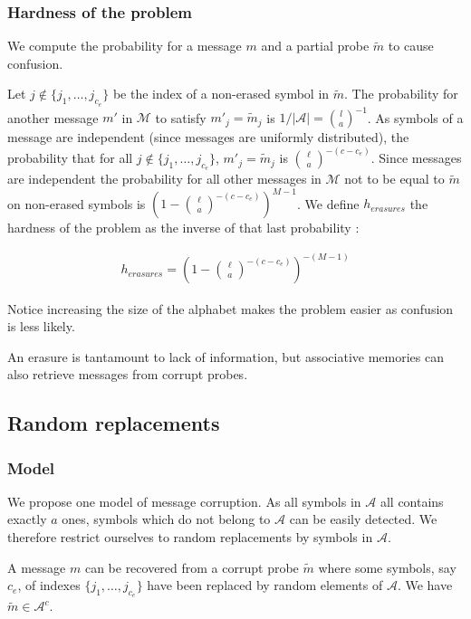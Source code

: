 \documentclass[english,10pt,twocolumn]{IEEEtran}
\theoremstyle{definition}
\begin{document}
	
	

	\subsubsection{Hardness of the problem}
	
	We compute the probability for a message $m$ and a partial probe $\tilde{m}$ to cause confusion.
	
	Let $j\not\in \{j_1, \dots , j_{c_e} \}$ be the index of a non-erased symbol in $\tilde{m}$. The probability for another message $m'$ in $\mathcal{M}$ to satisfy $m'_j = \tilde{m}_j$ is $1/|\mathcal{A}| = \binom{l}{a}^{-1}$. As symbols of a message are independent (since messages are uniformly distributed), the probability that for all $j\not\in \{j_1, \dots , j_{c_e} \}$, $m'_{j} = \tilde{m}_j$ is ${\ell \choose a}^{-(c - c_e)}$. Since messages are independent the probability for all other messages in $\mathcal{M}$ not to be equal to $\tilde{m}$ on non-erased symbols is $\left(1-{\ell \choose a}^{-(c - c_e)}\right)^{M-1}$. We define $h_{erasures}$ the hardness of the problem as the inverse of that last probability : 
	
	\begin{align}
		h_{erasures} = \left(1-{\ell \choose a}^{-(c - c_e)}\right)^{-(M-1)}
		\label{herrth}
	\end{align}
	
	Notice increasing the size of the alphabet makes the problem easier as confusion is less likely.

	An erasure is tantamount to lack of information, but associative memories can also retrieve messages from corrupt probes.
	
	\subsection{Random replacements}
	
	\subsubsection{Model}	
	We propose one model of message corruption. As all symbols in $\mathcal{A}$ all contains exactly $a$ ones, symbols which do not belong to $\mathcal{A}$ can be easily detected. We therefore restrict ourselves to random replacements by symbols in $\mathcal{A}$.
	
	A message $m$ can be recovered from a corrupt probe $\tilde{m}$ where some symbols, say $c_e$, of indexes $\{j_1, \dots , j_{c_e} \}$ have been replaced by random elements of $\mathcal{A}$. We have $\tilde{m} \in \mathcal{A}^c$.
	
\end{document}
